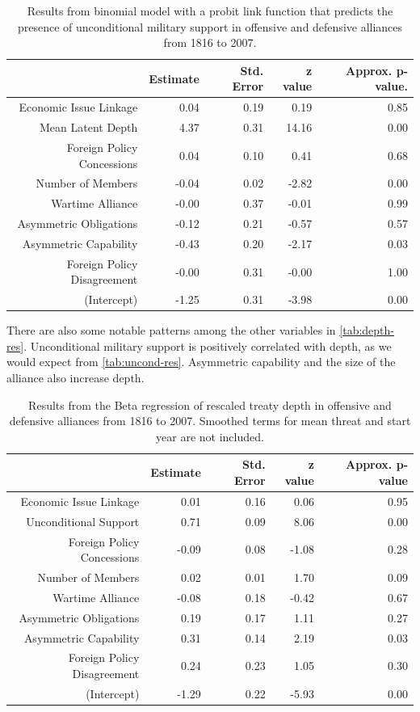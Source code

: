 \documentclass[12pt]{article}
\begin{document}
\begin{table}[ht]
\centering
\begin{tabular}{rrrrr}
  \hline
 & Estimate & Std. Error & z value & Approx. p-value. \\ 
  \hline 
  Economic Issue Linkage & 0.04 & 0.19 & 0.19 & 0.85 \\ 
  Mean Latent Depth & 4.37 & 0.31 & 14.16 & 0.00 \\ 
  Foreign Policy Concessions & 0.04 & 0.10 & 0.41 & 0.68 \\ 
  Number of Members & -0.04 & 0.02 & -2.82 & 0.00 \\ 
  Wartime Alliance & -0.00 & 0.37 & -0.01 & 0.99 \\ 
  Asymmetric Obligations & -0.12 & 0.21 & -0.57 & 0.57 \\ 
  Asymmetric Capability & -0.43 & 0.20 & -2.17 & 0.03 \\ 
  Foreign Policy Disagreement & -0.00 & 0.31 & -0.00 & 1.00 \\ 
  (Intercept) & -1.25 & 0.31 & -3.98 & 0.00 \\
   \hline
\end{tabular}
\caption{Results from binomial model with a probit link function that predicts the presence of unconditional military support in offensive and defensive alliances from 1816 to 2007.}
\label{tab:uncond-res}
\end{table}



There are also some notable patterns among the other variables in \autoref{tab:depth-res}. 
Unconditional military support is positively correlated with depth, as we would expect from \autoref{tab:uncond-res}. 
Asymmetric capability and the size of the alliance also increase depth. 


\begin{table}[ht]
\centering
\begin{tabular}{rrrrr}
  \hline
 & Estimate & Std. Error & z value & Approx. p-value \\ 
  \hline 
  Economic Issue Linkage & 0.01 & 0.16 & 0.06 & 0.95 \\ 
  Unconditional Support & 0.71 & 0.09 & 8.06 & 0.00 \\ 
  Foreign Policy Concessions & -0.09 & 0.08 & -1.08 & 0.28 \\ 
  Number of Members & 0.02 & 0.01 & 1.70 & 0.09 \\ 
  Wartime Alliance & -0.08 & 0.18 & -0.42 & 0.67 \\ 
  Asymmetric Obligations & 0.19 & 0.17 & 1.11 & 0.27 \\ 
  Asymmetric Capability & 0.31 & 0.14 & 2.19 & 0.03 \\ 
  Foreign Policy Disagreement & 0.24 & 0.23 & 1.05 & 0.30 \\ 
  (Intercept) & -1.29 & 0.22 & -5.93 & 0.00 \\
   \hline
\end{tabular}
\caption{Results from the Beta regression of rescaled treaty depth in offensive and defensive alliances from 1816 to 2007. Smoothed terms for mean threat and start year are not included.}
\label{tab:depth-res}
\end{table}
\end{document}
